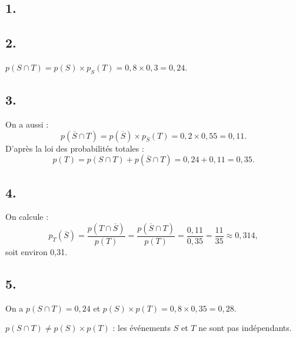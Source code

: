 \subsection*{1.}

\begin{center}
\end{center}

\subsection*{2.}

\(p(S \cap T) = p(S) \times p_S(T) = 0{,}8 \times 0{,}3 = 0{,}24\).

\subsection*{3.}

On a aussi :
\[
p(\overline{S} \cap T) = p(\overline{S}) \times p_{\overline{S}}(T) = 0{,}2 \times 0{,}55 = 0{,}11.
\]
D'après la loi des probabilités totales :
\[
p(T) = p(S \cap T) + p(\overline{S} \cap T) = 0{,}24 + 0{,}11 = 0{,}35.
\]

\subsection*{4.}

On calcule :
\[
p_T(\overline{S}) = \frac{p(T \cap \overline{S})}{p(T)} = \frac{p(\overline{S} \cap T)}{p(T)} = \frac{0{,}11}{0{,}35} = \frac{11}{35} \approx 0{,}314,
\]
soit environ 0{,}31.

\subsection*{5.}

On a \(p(S \cap T) = 0{,}24\) et \(p(S) \times p(T) = 0{,}8 \times 0{,}35 = 0{,}28\).

\(p(S \cap T) \neq p(S) \times p(T)\) : les événements \(S\) et \(T\) ne sont pas indépendants.
